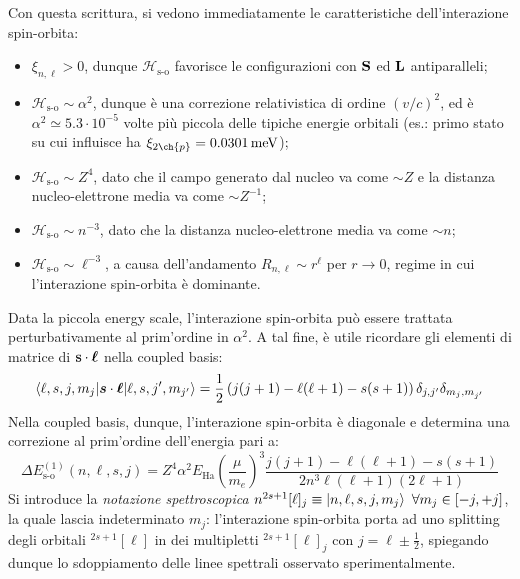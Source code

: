 Con questa scrittura, si vedono immediatamente le caratteristiche dell'interazione spin-orbita:
\begin{itemize}
	\item $ \xi_{n,\ell} > 0 $, dunque $ \mathcal{H}_\text{s-o} $ favorisce le configurazioni con $ \mathbf{S} $ ed $ \mathbf{L} $ antiparalleli;
	\item $ \mathcal{H}_\text{s-o} \sim \alpha^2 $, dunque è una correzione relativistica di ordine $ (v/c)^2 $, ed è $ \alpha^2 \simeq 5.3 \cdot 10^{-5} $ volte più piccola delle tipiche energie orbitali (es.: primo stato su cui influisce ha $ \xi_{2\ch{p}} = 0.0301 \,\text{meV} $);
	\item $ \mathcal{H}_\text{s-o} \sim Z^4 $, dato che il campo generato dal nucleo va come $ \sim Z $ e la distanza nucleo-elettrone media va come $ \sim Z^{-1} $;
	\item $ \mathcal{H}_\text{s-o} \sim n^{-3} $, dato che la distanza nucleo-elettrone media va come $ \sim n $;
	\item $ \mathcal{H}_\text{s-o} \sim \ell^{-3} $, a causa dell'andamento $ R_{n,\ell} \sim r^\ell $ per $ r \rightarrow 0 $, regime in cui l'interazione spin-orbita è dominante.
\end{itemize}
Data la piccola energy scale, l'interazione spin-orbita può essere trattata perturbativamente al prim'ordine in $ \alpha^2 $. A tal fine, è utile ricordare gli elementi di matrice di $ \mathbf{s} \cdot \boldsymbol{\ell} $ nella coupled basis:
\begin{equation}
	\braket{\ell,s,j,m_j | \boldsymbol{s} \cdot \boldsymbol{\ell} | \ell,s,j',m_{j'}} = \frac{1}{2} \left( j(j + 1) - \ell (\ell + 1) - s(s + 1) \right) \delta_{j,j'} \delta_{m_j, m_{j'}}
	\label{eq:1.16}
\end{equation}
Nella coupled basis, dunque, l'interazione spin-orbita è diagonale e determina una correzione al prim'ordine dell'energia pari a:
\begin{equation}
	\Delta E^{(1)}_\text{s-o}(n,\ell,s,j) = Z^4 \alpha^2 E_\text{Ha} \left( \frac{\mu}{m_e} \right)^3 \frac{j(j + 1) - \ell(\ell + 1) - s(s + 1)}{2n^3 \ell (\ell + 1) (2\ell + 1)}
	\label{eq:1.17}
\end{equation}
Si introduce la \textit{notazione spettroscopica} $ n ^{2s+1} [\ell] _j \equiv \ket{n,\ell,s,j, m_j} \,\,\forall m_j \in [-j,+j] $, la quale lascia indeterminato $ m_j $: l'interazione spin-orbita porta ad uno splitting degli orbitali $ ^{2s+1}[\ell] $ in dei multipletti $ ^{2s+1}[\ell]_j $ con $ j = \ell \pm \frac{1}{2} $, spiegando dunque lo sdoppiamento delle linee spettrali osservato sperimentalmente.

